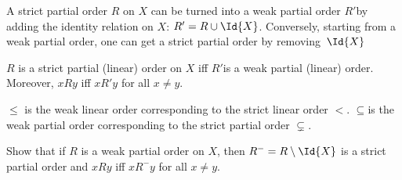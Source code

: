 \documentclass[../../include/open-logic-section]{subfiles}
\begin{document}
A strict partial order $R$ on $X$ can be turned into a weak partial
order $R'$by adding the identity relation on $X$: $R' = R \cup \Id{X}$.
Conversely, starting from a weak partial order, one can get a strict
partial order by removing~$\Id{X}$

\begin{prop}
$R$ is a strict partial (linear) order on $X$ iff $R'$is a weak
  partial (linear) order. Moreover, $xRy$ iff $xR'y$ for all $x \neq
  y$.
\end{prop}

\begin{ex}
$\le$ is the weak linear order corresponding to the strict linear
  order $<$. $\subseteq$is the weak partial order corresponding to the
  strict partial order $\subsetneq$.
\end{ex}

\begin{prob}
Show that if $R$ is a weak partial order on $X$, then
$R^{-}=R\setminus \Id{X}$ is a strict partial order and $xRy$ iff
$xR^{-}y$ for all $x\neq y$.
\end{prob}
\end{document}
